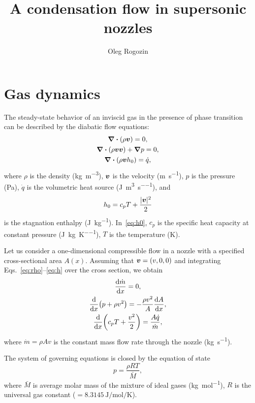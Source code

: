 \documentclass{article}
\title{A condensation flow in supersonic nozzles}
\author{Oleg Rogozin}
\newcommand{\bv}{\vb*{v}}
\begin{document}
\maketitle
\tableofcontents

\section{Gas dynamics}

The steady-state behavior of an inviscid gas in the presence of phase transition
can be described by the diabatic flow equations:
\begin{gather}
    \div(\rho\bv) = 0, \label{eq:rho}\\
    \div(\rho\bv\bv) + \grad{p} = 0, \label{eq:v}\\
    \div(\rho\bv h_0) = \dot{q}, \label{eq:h}
\end{gather}
where $\rho$ is the density (\si{\kg\per\cubic\m}), $\bv$ is the velocity (\si{\m\per\s}),
$p$ is the pressure (\si{\Pa}), $\dot{q}$ is the volumetric heat source (\si{\J\per\cubic\m\per\s}), and
\begin{equation}\label{eq:h0}
    h_0 = c_pT + \frac{|\bv|^2}{2}
\end{equation}
is the stagnation enthalpy (\si{\J\per\kg}). In~\eqref{eq:h0},
$c_p$ is the specific heat capacity at constant pressure (\si{\J\per\kg\per\K}), $T$ is the temperature (\si{\K}).

Let us consider a one-dimensional compressible flow in a nozzle with a specified cross-sectional area $A(x)$.
Assuming that $\bv = (v,0,0)$ and integrating Eqs.~\eqref{eq:rho}--\eqref{eq:h} over the cross section, we obtain
\begin{gather}
    \dv{\dot{m}}{x} = 0, \label{eq:continuity}\\
    \dv{x}(p + \rho v^2) = -\frac{\rho v^2}{A}\dv{A}{x}, \label{eq:momentum}\\
    \dv{x}(c_pT + \frac{v^2}{2}) = \frac{A\dot{q}}{\dot{m}}, \label{eq:energy}
\end{gather}
where $\dot{m} = \rho Av$ is the constant mass flow rate through the nozzle (\si{\kg\per\s}).

The system of governing equations is closed by the equation of state
\begin{equation}\label{eq:eos}
    p = \frac{\rho RT}{\bar{M}},
\end{equation}
where $\bar{M}$ is average molar mass of the mixture of ideal gases (\si{\kg\per\mol}),
$R$ is the universal gas constant ($= \SI{8.3145}{\J\per\mol\per\K}$).
\end{document}
